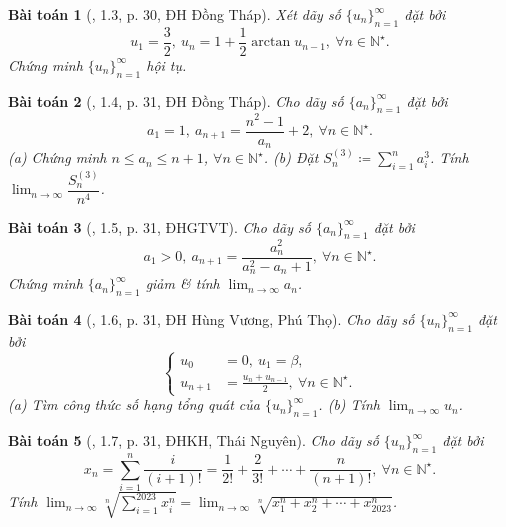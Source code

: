 \documentclass[oneside]{book}
\newtheorem{baitoan}{Bài toán}
\begin{document}
\begin{baitoan}[\cite{VMS_VMC2023}, 1.3, p. 30, ĐH Đồng Tháp]
	Xét dãy số $\{u_n\}_{n=1}^\infty$ đặt bởi
	\begin{equation*}
		u_1 = \frac{3}{2},\ u_n = 1 + \frac{1}{2}\arctan u_{n-1},\ \forall n\in\mathbb{N}^\star.
	\end{equation*}
	Chứng minh $\{u_n\}_{n=1}^\infty$ hội tụ.
\end{baitoan}

\begin{baitoan}[\cite{VMS_VMC2023}, 1.4, p. 31, ĐH Đồng Tháp]
	Cho dãy số $\{a_n\}_{n=1}^\infty$ đặt bởi
	\begin{equation*}
		a_1 = 1,\ a_{n+1} = \frac{n^2 - 1}{a_n} + 2,\ \forall n\in\mathbb{N}^\star.
	\end{equation*}
	(a) Chứng minh $n\le a_n\le n + 1$, $\forall n\in\mathbb{N}^\star$. (b) Đặt $S_n^{(3)}\coloneqq\sum_{i=1}^n a_i^3$. Tính $\lim_{n\to\infty} \dfrac{S_n^{(3)}}{n^4}$.
\end{baitoan}

\begin{baitoan}[\cite{VMS_VMC2023}, 1.5, p. 31, ĐHGTVT]
	Cho dãy số $\{a_n\}_{n=1}^\infty$ đặt bởi
	\begin{equation*}
		a_1 > 0,\ a_{n+1} = \frac{a_n^2}{a_n^2 - a_n + 1},\ \forall n\in\mathbb{N}^\star.
	\end{equation*}
	Chứng minh $\{a_n\}_{n=1}^\infty$ giảm \& tính $\lim_{n\to\infty} a_n$.
\end{baitoan}

\begin{baitoan}[\cite{VMS_VMC2023}, 1.6, p. 31, ĐH Hùng Vương, Phú Thọ]
	Cho dãy số $\{u_n\}_{n=1}^\infty$ đặt bởi
	\begin{equation*}
		\left\{\begin{split}
			u_0 &= 0,\ u_1 = \beta,\\
			u_{n+1} &= \frac{u_n + u_{n-1}}{2},\ \forall n\in\mathbb{N}^\star.
		\end{split}\right.
	\end{equation*}
	(a) Tìm công thức số hạng tổng quát của $\{u_n\}_{n=1}^\infty$. (b) Tính $\lim_{n\to\infty} u_n$.
\end{baitoan}

\begin{baitoan}[\cite{VMS_VMC2023}, 1.7, p. 31, ĐHKH, Thái Nguyên]
	Cho dãy số $\{u_n\}_{n=1}^\infty$ đặt bởi
	\begin{equation*}
		x_n = \sum_{i=1}^n \frac{i}{(i + 1)!} = \frac{1}{2!} + \frac{2}{3!} + \cdots + \frac{n}{(n + 1)!},\ \forall n\in\mathbb{N}^\star.
	\end{equation*}
	Tính $\lim_{n\to\infty} \sqrt[n]{\sum_{i=1}^{2023} x_i^n} = \lim_{n\to\infty} \sqrt[n]{x_1^n + x_2^n + \cdots + x_{2023}^n}$.
\end{baitoan}
\end{document}
